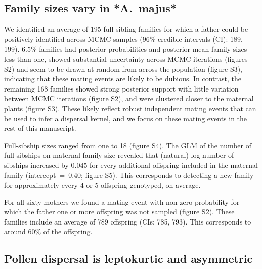 \documentclass[10pt, a4paper, twocolumn]{article} %
\begin{document}

\subsection{Family sizes vary in *A.~majus*}

We identified an average of 195 full-sibling families for which a father could be positively identified across MCMC samples (96\% credible intervals (CI): 189, 199).
6.5\% families had posterior probabilities and posterior-mean family sizes less than one, showed substantial uncertainty across MCMC iterations (figures S2) and seem to be drawn at random from across the population (figure S3), indicating that these mating events are likely to be dubious.
In contrast, the remaining 168 families showed strong posterior support with little variation between MCMC iterations (figure S2), and were clustered closer to the maternal plants (figure S3).
These likely reflect robust independent mating events that can be used to infer a dispersal kernel, and we focus on these mating events in the rest of this manuscript.

Full-sibship sizes ranged from one to 18 (figure S4).
The GLM of the number of full sibships on maternal-family size revealed that (natural) log number of sibships increased by 0.045 for every additional offspring included in the maternal family (intercept~=~0.40; figure S5). This corresponds to detecting a new family for approximately every 4 or 5 offspring genotyped, on average.

For all sixty mothers we found a mating event with non-zero probability for which the father one or more offspring was not sampled (figure S2).
These families include an average of 789 offspring (CIs: 785, 793).
This corresponds to around 60\% of the offspring.

\subsection{Pollen dispersal is leptokurtic and asymmetric}
\end{document}
